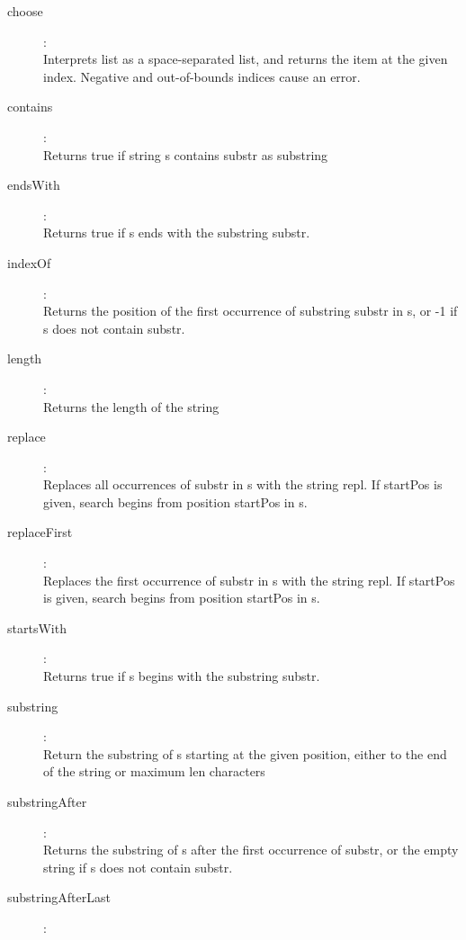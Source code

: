 \begin{description}
\item[choose]:  \\
    Interprets list as a space-separated list, and returns the item at the given index. Negative and out-of-bounds indices cause an error.
\item[contains]:  \\
    Returns true if string s contains substr as substring
\item[endsWith]:  \\
    Returns true if s ends with the substring substr.
\item[indexOf]:  \\
    Returns the position of the first occurrence of substring substr in s, or -1 if s does not contain substr.
\item[length]:  \\
    Returns the length of the string
\item[replace]:  \\
    Replaces all occurrences of substr in s with the string repl. If startPos is given, search begins from position startPos in s.
\item[replaceFirst]:  \\
    Replaces the first occurrence of substr in s with the string repl. If startPos is given, search begins from position startPos in s.
\item[startsWith]:  \\
    Returns true if s begins with the substring substr.
\item[substring]:  \\
    Return the substring of s starting at the given position, either to the end of the string or maximum len characters
\item[substringAfter]:  \\
    Returns the substring of s after the first occurrence of substr, or the empty string if s does not contain substr.
\item[substringAfterLast]:  \\

\end{description}
